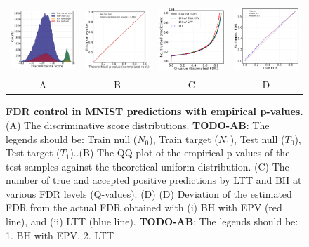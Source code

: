 \documentclass{article}
\newcommand{\todo}[2]{{\color{red} {\bf TODO-#1}: #2}}
\begin{document}
\begin{figure}
	\centering
	\begin{tabular}{cccc}
		\includegraphics[width=1.7in]{img/cls_overview.png}&
		\includegraphics[width=1.7in]{img/cnn_QQ_classical_lin.png} &
		\includegraphics[width=1.7in]{img/cnn_classical_fdr_control.png} &
		\includegraphics[width=1.7in]{img/cnn_FDRQQ_classical.png} \\
			
		A & B & C & D \\

	\end{tabular}
	\caption{{\bf FDR control in MNIST predictions with empirical p-values. } (A) The discriminative score distributions. \todo{AB}{The legends should be: Train null ($N_0$), Train target ($N_1$), Test null ($T_0$), Test target ($T_1$).}.(B) The QQ plot of the empirical p-values of the test samples against the theoretical uniform distribution. (C) The number of true and accepted positive predictions by LTT and BH at various FDR levels (Q-values).  (D)  (D) Deviation of the estimated FDR from the actual FDR obtained with (i) BH with EPV (red line), and (ii) LTT (blue line). \todo{AB}{The legends should be: 1. BH with EPV, 2. LTT} }
	\label{fig:binary}
\end{figure}
 
\end{document}
